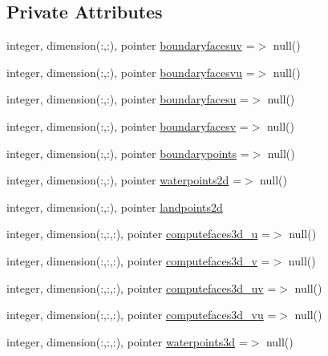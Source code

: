 \subsection*{Private Attributes}
\begin{DoxyCompactItemize}
\item 
integer, dimension(\+:,\+:), pointer \mbox{\hyperlink{structmodulehydrodynamic_1_1t__external_ab5f755de65a67d3c55edfe41477e5a4c}{boundaryfacesuv}} =$>$ null()
\item 
integer, dimension(\+:,\+:), pointer \mbox{\hyperlink{structmodulehydrodynamic_1_1t__external_a3b9b6911586c9571b52fbac4e32248a9}{boundaryfacesvu}} =$>$ null()
\item 
integer, dimension(\+:,\+:), pointer \mbox{\hyperlink{structmodulehydrodynamic_1_1t__external_acc9f37eae9e9abfd140dd5ace00693a0}{boundaryfacesu}} =$>$ null()
\item 
integer, dimension(\+:,\+:), pointer \mbox{\hyperlink{structmodulehydrodynamic_1_1t__external_ae7229d304ee0fe0ca3250d63bc21c365}{boundaryfacesv}} =$>$ null()
\item 
integer, dimension(\+:,\+:), pointer \mbox{\hyperlink{structmodulehydrodynamic_1_1t__external_a8ba20e63ed13af920cdeb8a6f3fe6d3f}{boundarypoints}} =$>$ null()
\item 
integer, dimension(\+:,\+:), pointer \mbox{\hyperlink{structmodulehydrodynamic_1_1t__external_af46ea838d9f5b8229b44850754d07bbc}{waterpoints2d}} =$>$ null()
\item 
integer, dimension(\+:,\+:), pointer \mbox{\hyperlink{structmodulehydrodynamic_1_1t__external_aee458c1fc212e3c2b5b4441ca24aaaa5}{landpoints2d}}
\item 
integer, dimension(\+:,\+:,\+:), pointer \mbox{\hyperlink{structmodulehydrodynamic_1_1t__external_a5e555c3fb258e395b870f8e19e0fc3f2}{computefaces3d\+\_\+u}} =$>$ null()
\item 
integer, dimension(\+:,\+:,\+:), pointer \mbox{\hyperlink{structmodulehydrodynamic_1_1t__external_ae415a483f95358e22c164ee6a0884b9d}{computefaces3d\+\_\+v}} =$>$ null()
\item 
integer, dimension(\+:,\+:,\+:), pointer \mbox{\hyperlink{structmodulehydrodynamic_1_1t__external_ab91115bc566989bff5100e04e5e751cb}{computefaces3d\+\_\+uv}} =$>$ null()
\item 
integer, dimension(\+:,\+:,\+:), pointer \mbox{\hyperlink{structmodulehydrodynamic_1_1t__external_a5bf5edef66e8d936fec125fb747b687d}{computefaces3d\+\_\+vu}} =$>$ null()
\item 
integer, dimension(\+:,\+:,\+:), pointer \mbox{\hyperlink{structmodulehydrodynamic_1_1t__external_a1c02da3d87d08013245f85437ddd41a3}{waterpoints3d}} =$>$ null()

\end{DoxyCompactItemize}
